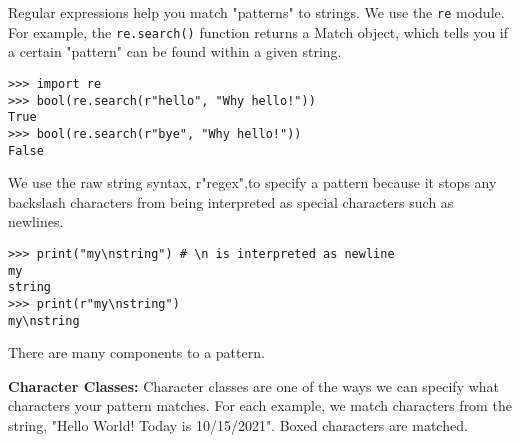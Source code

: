 Regular expressions help you match "patterns" to strings. We use the \lstinline{re} module.
For example, the \lstinline{re.search()} function returns a Match object, which tells you if a certain "pattern" can be found within a given string.

\begin{lstlisting}
>>> import re
>>> bool(re.search(r"hello", "Why hello!"))
True
>>> bool(re.search(r"bye", "Why hello!"))
False
\end{lstlisting}

We use the raw string syntax, r"regex",to specify a pattern because
it stops any backslash characters from being interpreted as special characters such as newlines.

\begin{lstlisting}
>>> print("my\nstring") # \n is interpreted as newline
my
string
>>> print(r"my\nstring")
my\nstring
\end{lstlisting}

There are many components to a pattern.

\newpage
\textbf{Character Classes:}
Character classes are one of the ways we can specify what characters your pattern matches.
For each example, we match characters from the string, "Hello World! Today is 10/15/2021".
Boxed characters are matched.

